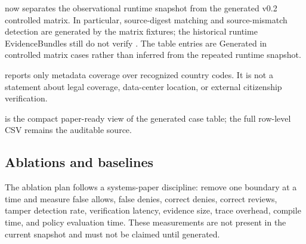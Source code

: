 \begin{table}[t]
\centering
\caption{Controlled evaluation matrix generated for v0.2. Rows describe local
metadata, policy, provider, evidence, and source-digest cases, not legal or
external identity assurance.}
\label{tab:controlled-matrix}

\end{table}

 now separates the observational runtime snapshot
from the generated v0.2 controlled matrix.  In particular, source-digest
matching and source-mismatch detection are generated by the matrix fixtures;
the historical runtime EvidenceBundles still do not verify .
The table entries are Generated in controlled matrix cases rather than inferred
from the repeated runtime snapshot.

\begin{table}[t]
\centering
\caption{Passport jurisdiction coverage in the controlled matrix. EU is not
counted as a country; it is used only as a regional residency zone.}
\label{tab:passport-coverage}

\end{table}

 reports only metadata coverage over recognized
country codes.  It is not a statement about legal coverage, data-center
location, or external citizenship verification.

\begin{table}[t]
\centering
\caption{Controlled artifact matrix summary derived from
.}
\label{tab:matrix-summary}

\end{table}

 is the compact paper-ready view of the generated
case table; the full row-level CSV remains the auditable source.

\subsection{Ablations and baselines}
The ablation plan follows a systems-paper discipline: remove one boundary at a
time and measure false allows, false denies, correct denies, correct reviews,
tamper detection rate, verification latency, evidence size, trace overhead,
compile time, and policy evaluation time.  These measurements are not present
in the current snapshot and must not be claimed until generated.

